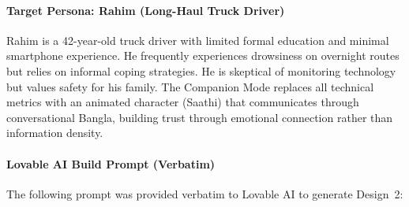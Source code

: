 \documentclass[sigconf]{acmart}
\begin{document}
\paragraph{Target Persona: Rahim (Long-Haul Truck Driver)}
Rahim is a 42-year-old truck driver with limited formal education and minimal smartphone experience. He frequently experiences drowsiness on overnight routes but relies on informal coping strategies. He is skeptical of monitoring technology but values safety for his family. The Companion Mode replaces all technical metrics with an animated character (Saathi) that communicates through conversational Bangla, building trust through emotional connection rather than information density.

\paragraph{Lovable AI Build Prompt (Verbatim)}
The following prompt was provided verbatim to Lovable AI to generate Design~2:
\end{document}
